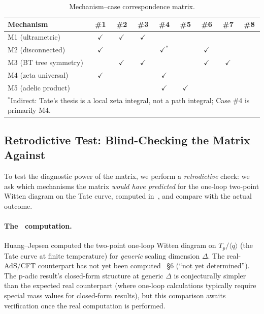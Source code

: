\documentclass[11pt,a4paper]{article}
\newcommand{\Tp}{T_p}
\begin{document}
\begin{table}[H]
\centering
\caption{Mechanism--case correspondence matrix.}
\label{tab:matrix}
\begin{tabular}{lcccccccc}
\toprule
Mechanism & \#1 & \#2 & \#3 & \#4 & \#5 & \#6 & \#7 & \#8 \\
\midrule
M1 (ultrametric)         & $\checkmark$ & $\checkmark$ & $\checkmark$ & & & & & \\
M2 (disconnected)        & $\checkmark$ & & & $\checkmark^{*}$ & & $\checkmark$ & & \\
M3 (BT tree symmetry)    & & $\checkmark$ & $\checkmark$ & & & $\checkmark$ & $\checkmark$ & \\
M4 (zeta universal)      & $\checkmark$ & & & $\checkmark$ & & & & \\
M5 (adelic product)      & & & & $\checkmark$ & $\checkmark$ & & & \\
\bottomrule
\multicolumn{9}{l}{\footnotesize $^{*}$Indirect: Tate's thesis is a local zeta integral, not a path integral; Case \#4 is primarily M4.}
\end{tabular}
\end{table}

\subsection{Retrodictive Test: Blind-Checking the Matrix Against~\cite{HJ24}}
\label{sec:retro}

To test the diagnostic power of the matrix, we perform a \emph{retrodictive} check: we ask which mechanisms the matrix \emph{would have predicted} for the one-loop two-point Witten diagram on the Tate curve, computed in~\cite{HJ24}, and compare with the actual outcome.

\paragraph{The~\cite{HJ24} computation.}
Huang--Jepsen computed the two-point one-loop Witten diagram on $\Tp/\langle q \rangle$ (the Tate curve at finite temperature) for \emph{generic} scaling dimension $\Delta$. The real-AdS/CFT counterpart has not yet been computed~\cite{HJ24} \S6 (``not yet determined''). The p-adic result's closed-form structure at generic $\Delta$ is conjecturally simpler than the expected real counterpart (where one-loop calculations typically require special mass values for closed-form results), but this comparison awaits verification once the real computation is performed.
\end{document}
